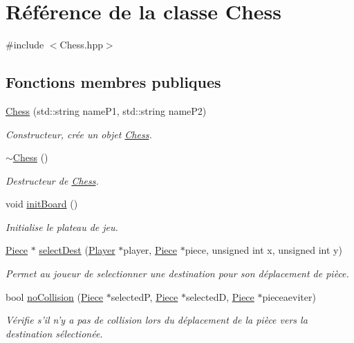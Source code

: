 \hypertarget{class_chess}{\section{Référence de la classe Chess}
\label{class_chess}
}


{\ttfamily \#include $<$Chess.\-hpp$>$}

\subsection*{Fonctions membres publiques}
\begin{DoxyCompactItemize}
\item 
\hyperlink{class_chess_a7524da0608df5a385dfd25d23d2d4e50}{Chess} (std\-::string name\-P1, std\-::string name\-P2)
\begin{DoxyCompactList}\small\item\em Constructeur, crée un objet \hyperlink{class_chess}{Chess}. \end{DoxyCompactList}\item 
\hyperlink{class_chess_aa9717ab5263bc4fbb844e78bbe5587a8}{$\sim$\-Chess} ()
\begin{DoxyCompactList}\small\item\em Destructeur de \hyperlink{class_chess}{Chess}. \end{DoxyCompactList}\item 
void \hyperlink{class_chess_a8fc79b0c34c21d522abd9b8ae62ee38f}{init\-Board} ()
\begin{DoxyCompactList}\small\item\em Initialise le plateau de jeu. \end{DoxyCompactList}\item 
\hyperlink{class_piece}{Piece} $\ast$ \hyperlink{class_chess_a67069ea8ee1fce34961fc9c645c4dc10}{select\-Dest} (\hyperlink{class_player}{Player} $\ast$player, \hyperlink{class_piece}{Piece} $\ast$piece, unsigned int x, unsigned int y)
\begin{DoxyCompactList}\small\item\em Permet au joueur de selectionner une destination pour son déplacement de pièce. \end{DoxyCompactList}\item 
bool \hyperlink{class_chess_ae24e3b25128b76757859c913fae1930f}{no\-Collision} (\hyperlink{class_piece}{Piece} $\ast$selected\-P, \hyperlink{class_piece}{Piece} $\ast$selected\-D, \hyperlink{class_piece}{Piece} $\ast$pieceaeviter)
\begin{DoxyCompactList}\small\item\em Vérifie s'il n'y a pas de collision lors du déplacement de la pièce vers la destination sélectionée. \end{DoxyCompactList}\item 

\end{DoxyCompactItemize}
